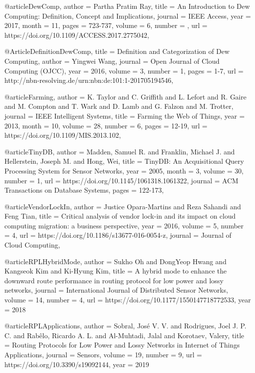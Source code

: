 \documentclass[english,version-2019-11]{uzl-thesis}
\begin{document}
\begin{bibtex-entries}
@article{DewComp,
    author  = {Partha Pratim Ray},
    title   = {An Introduction to Dew Computing: Definition, Concept and Implications}, 
    journal = {IEEE Access}, 
    year    = {2017},
    month = {11},
    pages   = {723-737},
    volume  = {6},
    number  = {},
    url     = {https://doi.org/10.1109/ACCESS.2017.2775042},
}

    @Article{DefinitionDewComp,
        title     = {Definition and Categorization of Dew Computing},
        author    = {Yingwei Wang},
        journal   = {Open Journal of Cloud Computing (OJCC)},
        year      = {2016},
        volume    = {3},
        number    = {1},
        pages     = {1-7},
        url       = {http://nbn-resolving.de/urn:nbn:de:101:1-201705194546},
    }
  
@article{Farming,
    author  = {K. {Taylor} and C. {Griffith} and L. {Lefort} and R. {Gaire} and M. {Compton} and T. {Wark} and D. {Lamb} and G. {Falzon} and M. {Trotter}},
    journal = {IEEE Intelligent Systems},
    title   = {Farming the Web of Things},
    year    = {2013},
    month = {10},
    volume  = {28},
    number  = {6},
    pages   = {12-19},
    url     = {https://doi.org/10.1109/MIS.2013.102},
}

@article{TinyDB,
    author = {Madden, Samuel R. and Franklin, Michael J. and Hellerstein, Joseph M. and Hong, Wei},
    title = {TinyDB: An Acquisitional Query Processing System for Sensor Networks},
    year = {2005},
    month = {3},
    volume = {30},
    number = {1},
    url = {https://doi.org/10.1145/1061318.1061322},
    journal = {ACM Transactions on Database Systems},
    pages = {122-173},
}

@article{VendorLockIn,
    author = {Justice Opara-Martins and Reza Sahandi and Feng Tian},
    title = {Critical analysis of vendor lock-in and its impact on cloud computing migration: a business perspective},
    year = {2016},
    volume = {5},
    number = {4},
    url = {https://doi.org/10.1186/s13677-016-0054-z},
    journal = {Journal of Cloud Computing},
}


@article{RPLHybridMode,
    author = {Sukho Oh and DongYeop Hwang and Kangseok Kim and Ki-Hyung Kim},
    title = {A hybrid mode to enhance the downward route performance in routing protocol for low power and lossy networks},
    journal = {International Journal of Distributed Sensor Networks},
    volume = {14},
    number = {4},
    url = {https://doi.org/10.1177/1550147718772533},
    year = {2018}
}

@article{RPLApplications,
    author = {Sobral, José V. V. and Rodrigues, Joel J. P. C. and Rabêlo, Ricardo A. L. and Al-Muhtadi, Jalal and Korotaev, Valery},
    title = {Routing Protocols for Low Power and Lossy Networks in Internet of Things Applications},
    journal = {Sensors},
    volume = {19},
    number = {9},
    url = {https://doi.org/10.3390/s19092144},
    year = {2019}
}


\end{bibtex-entries}
\end{document}

